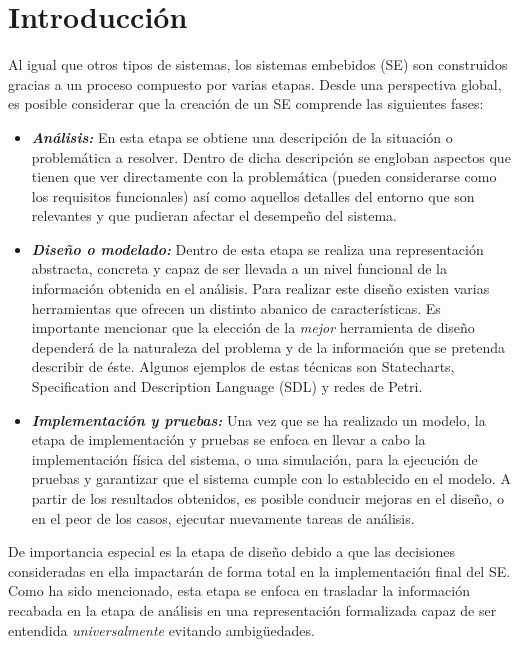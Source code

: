 \documentclass[journal]{IEEEtran}
\begin{document}
\section{Introducción}
\label{sec:introduccion}
Al igual que otros tipos de sistemas, los sistemas embebidos (SE) son construidos gracias a un proceso compuesto por varias etapas.
Desde una perspectiva global, es posible considerar que la creación de un SE comprende las siguientes fases:
\begin{itemize}
	\item \emph{\textbf{Análisis:}} En esta etapa se obtiene una descripción de la situación o problemática a resolver.
	Dentro de dicha descripción se engloban aspectos que tienen que ver directamente con la problemática (pueden considerarse como los requisitos funcionales) así como aquellos detalles del entorno que son relevantes y que pudieran afectar el desempeño del sistema.
	
	\item \emph{\textbf{Diseño o modelado:}} Dentro de esta etapa se realiza una representación abstracta, concreta y capaz de ser llevada a un nivel funcional de la información obtenida en el análisis.
	Para realizar este diseño existen varias herramientas que ofrecen un distinto abanico de características.
	Es importante mencionar que la elección de la \emph{mejor} herramienta de diseño dependerá de la naturaleza del problema y de la información que se pretenda describir de éste.
	Algunos ejemplos de estas técnicas son Statecharts, Specification and Description Language (SDL) y redes de Petri.
	
	\item \emph{\textbf{Implementación y pruebas:}} Una vez que se ha realizado un modelo, la etapa de implementación y pruebas se enfoca en llevar a cabo la implementación física del sistema, o una simulación, para la ejecución de pruebas y garantizar que el sistema cumple con lo establecido en el modelo.
	A partir de los resultados obtenidos, es posible conducir mejoras en el diseño, o en el peor de los casos, ejecutar nuevamente tareas de análisis.
\end{itemize}

De importancia especial es la etapa de diseño debido a que las decisiones consideradas en ella impactarán de forma total en la implementación final del SE.
Como ha sido mencionado, esta etapa se enfoca en trasladar la información recabada en la etapa de análisis en una representación formalizada capaz de ser entendida \emph{universalmente} evitando ambigüedades. 
\end{document}
